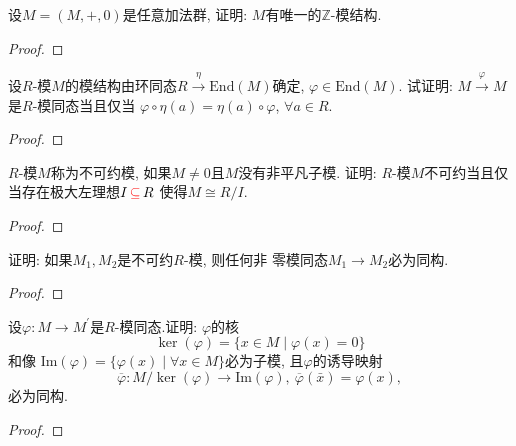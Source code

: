 \begin{problem}
    设$M = (M, +, 0)$是任意加法群, 证明: $M$有唯一的$\mathbb{Z}$-模结构.
\end{problem}

\begin{proof}
    
\end{proof}

\begin{problem}
    设$R$-模$M$的模结构由环同态$R \xrightarrow{\eta} \mathrm{End}(M)$确定, 
$\varphi \in \mathrm{End}(M)$. 试证明: 
$M \xrightarrow{\varphi} M$是$R$-模同态当且仅当
$\varphi \circ \eta (a) = \eta (a) \circ \varphi$, $\forall a \in R$.
\end{problem}

\begin{proof}
    
\end{proof}

\begin{problem}
    $R$-模$M$称为不可约模, 如果$M \neq 0$且$M$没有非平凡子模.
证明: $R$-模$M$不可约当且仅当存在极大左理想$I \,\textcolor{red}{\subseteq}\, R$
使得$M \cong R/I$.
\end{problem}

\begin{proof}
    
\end{proof}

\begin{problem}[舒尔(Schur)引理]
    证明: 如果$M_1, M_2$是不可约$R$-模, 则任何非
零模同态$M_1 \to M_2$必为同构.
\end{problem}

\begin{proof}
    
\end{proof}

\begin{problem}[同态基本定理]
    设$\varphi:M\to M^{\prime}$是$R$-模同态.证明: $\varphi$的核
\[
    \ker(\varphi) = \{x \in M \mid \varphi(x) = 0\}
\]
和像 $\mathrm{Im}(\varphi) = \{\varphi(x) \mid \forall x \in M\}$必为子模, 
且$\varphi$的诱导映射
\[
    \overline{\varphi}:M/\ker(\varphi) \to \mathrm{Im}(\varphi),\: \overline{\varphi}(\bar{x}) = \varphi(x),
\]
必为同构.
\end{problem}

\begin{proof}
    
\end{proof}